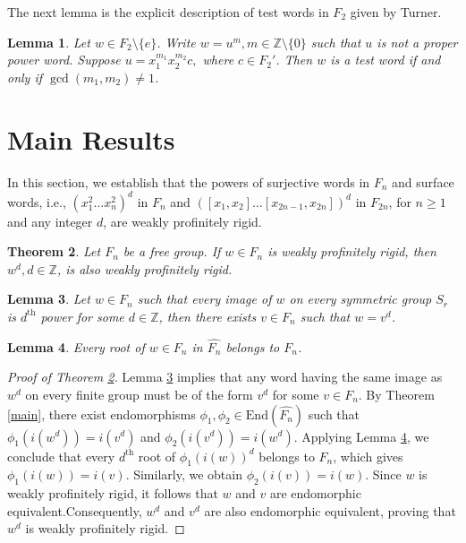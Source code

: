 \documentclass[12pt]{amsart}
\def \Z {{\mathbb{Z}}}
\newtheorem{theorem}{Theorem}[section]
\newtheorem{lemma}[theorem]{Lemma}
\begin{document}
The next lemma is the explicit description of test words in $F_2$ given by Turner.
\begin{lemma}\cite{Turner}\label{turner2}
     Let $w \in F_2 \setminus \{e\}$. Write $w = u^m, m \in \Z \setminus \{0\}$ such that $u$ is not a proper power word. Suppose $u = x_1^{m_1}x_2^{m_2}c,$ where $c \in F_2'$. Then $w$ is a test word if and only if $\gcd(m_1,m_2) \ne 1$.
\end{lemma}

\section{Main Results}
In this section, we establish that the powers of surjective words in $F_n$ and surface words,  i.e., $(x_1^2\ldots x_n^2)^d$ in $F_n$ and $([x_1,x_2]\ldots [x_{2n-1},x_{2n}])^d$ in $F_{2n}$, for $n \geq 1$ and any integer $d$, are weakly profinitely rigid. 
\begin{theorem}\label{main1}
    Let $F_n$ be a free group. If $w \in F_n$ is weakly profinitely rigid, then $w^d, d \in \Z$, is also weakly profinitely rigid.
\end{theorem}
\begin{lemma}\cite[Theorem~4.8]{hanany2020some}\label{L1}
    Let $w \in F_n$ such that every image of $w$ on every symmetric group $S_r$ is $d^{\text{th}}$ power for some $d \in \mathbb{Z}$, then there exists $v \in F_n$ such that $w = v^d$. 
\end{lemma}
  
\begin{lemma}\cite[Corollary~4.4]{hanany2020some}\label{L2}
    Every root of $w \in F_n$ in $\widehat{F_n}$ belongs to $F_n$.
\end{lemma}

\begin{proof}[Proof of Theorem \ref{main1}]
     Lemma \ref{L1} implies that any word having the same image as $w^d$ on every finite group must be of the form $v^d$ for some $v \in F_n$. By Theorem \ref{main}, there exist endomorphisms $\phi_1, \phi_2 \in \mathrm{End}(\widehat{F_n})$ such that $\phi_1(i(w^d)) = i(v^d)$ and $\phi_2(i(v^d)) = i(w^d)$. Applying Lemma \ref{L2}, we conclude that every $d^{\text{th}}$ root of $\phi_1(i(w))^d$ belongs to $F_n$, which gives $\phi_1(i(w)) = i(v).$ Similarly, we obtain $\phi_2(i(v)) = i(w)$. Since $w$ is weakly profinitely rigid, it follows that $w$ and $v$ are endomorphic equivalent.Consequently, $w^d$ and $v^d$ are also endomorphic equivalent, proving that $w^d$ is weakly profinitely rigid.
\end{proof}
\end{document}
